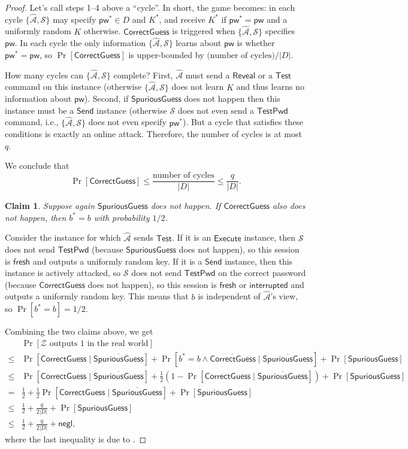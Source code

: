 \documentclass{article}
\newtheorem{claim}{Claim}
\newcommand{\negl}{\mathsf{negl}}
\newcommand{\adv}{\mathcal{A}}
\newcommand{\env}{\mathcal{Z}}
\renewcommand{\sim}{\mathcal{S}}
\newcommand{\pw}{\mathsf{pw}}
\newcommand{\TestPwd}{\mathsf{TestPwd}}
\newcommand{\fresh}{\mathsf{fresh}}
\newcommand{\interrupted}{\mathsf{interrupted}}
\newcommand{\Execute}{\mathsf{Execute}}
\newcommand{\Send}{\mathsf{Send}}
\newcommand{\Reveal}{\mathsf{Reveal}}
\newcommand{\Test}{\mathsf{Test}}
\newcommand{\SpuriousGuess}{\mathsf{SpuriousGuess}}
\newcommand{\CorrectGuess}{\mathsf{CorrectGuess}}
\begin{document}
\begin{proof}
Let's call steps 1--4 above a ``cycle''. In short, the game becomes: in each cycle $\{\widehat{\adv}, \sim\}$ may specify $\pw^* \in D$ and $K^*$, and receive $K^*$ if $\pw^* = \pw$ and a uniformly random $K$ otherwise. $\CorrectGuess$ is triggered when $\{\widehat{\adv}, \sim\}$ specifies $\pw$. In each cycle the only information $\{\widehat{\adv}, \sim\}$ learns about $\pw$ is whether $\pw^* = \pw$, so $\Pr[\CorrectGuess]$ is upper-bounded by $\text{(number of cycles)}/|D|$.

How many cycles can $\{\widehat{\adv}, \sim\}$ complete? First, $\widehat{\adv}$ must send a $\Reveal$ or a $\Test$ command on this instance (otherwise $\{\widehat{\adv}, \sim\}$ does not learn $K$ and thus learns no information about $\pw$). Second, if $\SpuriousGuess$ does not happen then this instance must be a $\Send$ instance (otherwise $\sim$ does not even send a $\TestPwd$ command, i.e., $\{\widehat{\adv}, \sim\}$ does not even specify $\pw^*$). But a cycle that satisfies these conditions is exactly an online attack. Therefore, the number of cycles is at most $q$.

We conclude that
\[
\Pr[\CorrectGuess] \leq \frac{\text{number of cycles}}{|D|} \leq \frac{q}{|D|}.
\]
\begin{claim}
Suppose again $\SpuriousGuess$ does not happen. If $\CorrectGuess$ also does not happen, then $b^* = b$ with probability $1/2$.
\end{claim}
Consider the instance for which $\widehat{\adv}$ sends $\Test$. If it is an $\Execute$ instance, then $\sim$ does not send $\TestPwd$ (because $\SpuriousGuess$ does not happen), so this session is $\fresh$ and outputs a uniformly random key. If it is a $\Send$ instance, then this instance is actively attacked, so $\sim$ does not send $\TestPwd$ on the correct password (because $\CorrectGuess$ does not happen), so this session is $\fresh$ or $\interrupted$ and outputs a uniformly random key. This means that $b$ is independent of $\widehat{\adv}$'s view, so $\Pr[b^* = b] = 1/2$.

\medskip
Combining the two claims above, we get
\begin{align*}
&\Pr[\env\text{ outputs }1\text{ in the real world}] \\
\leq& \Pr[\CorrectGuess \mid \overline{\SpuriousGuess}] + \Pr[b^* = b \land \overline{\CorrectGuess} \mid \overline{\SpuriousGuess}] + \Pr[\SpuriousGuess] \\
\leq& \Pr[\CorrectGuess \mid \overline{\SpuriousGuess}] + \frac{1}{2}(1 - \Pr[\CorrectGuess \mid \overline{\SpuriousGuess}]) + \Pr[\SpuriousGuess] \\
=& \frac{1}{2} + \frac{1}{2}\Pr[\CorrectGuess \mid \overline{\SpuriousGuess}] + \Pr[\SpuriousGuess] \\
\leq& \frac{1}{2} + \frac{q}{2|D|} + \Pr[\SpuriousGuess] \\
\leq& \frac{1}{2} + \frac{q}{2|D|} + \negl,
\end{align*}
where the last inequality is due to .

\end{proof}
\end{document}
